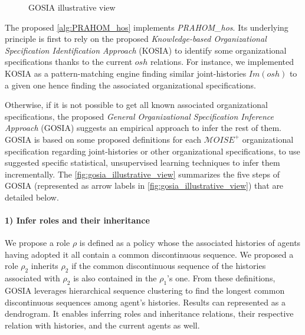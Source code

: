 \documentclass[doubleblind]{ecai}
\newcounter{relation}
\begin{document}
\label{alg:PRAHOM_hos}

\begin{figure}[h!]
    \centering
    
    \caption{GOSIA illustrative view}
    \label{fig:gosia_illustrative_view}
\end{figure}

The proposed \autoref{alg:PRAHOM_hos} implements \emph{PRAHOM\_hos}. Its underlying principle is first to rely on the proposed \emph{Knowledge-based Organizational Specification Identification Approach} (KOSIA) to identify some organizational specifications thanks to the current $osh$ relations. %
For instance, we implemented KOSIA as a pattern-matching engine finding similar joint-histories $Im(osh)$ to a given one hence finding the associated organizational specifications.

Otherwise, if it is not possible to get all known associated organizational specifications, the proposed \emph{General Organizational Specification Inference Approach} (GOSIA) suggests an empirical approach to infer the rest of them.
GOSIA is based on some proposed definitions for each $\mathcal{M}OISE^+$ organizational specification regarding joint-histories or other organizational specifications, to use suggested specific statistical, unsupervised learning techniques to infer them incrementally. The \autoref{fig:gosia_illustrative_view} summarizes the five steps of GOSIA (represented as arrow labels in \autoref{fig:gosia_illustrative_view}) that are detailed below.
%
\paragraph{1) Infer roles and their inheritance}

We propose a role $\rho$ is defined as a policy whose the associated histories of agents having adopted it all contain a common discontinuous sequence. We proposed a role $\rho_2$ inherits $\rho_2$ if the common discontinuous sequence of the histories associated with $\rho_2$ is also contained in the $\rho_1$'s one.
From these definitions, GOSIA leverages hierarchical sequence clustering to find the longest common discontinuous sequences among agent's histories. Results can represented as a dendrogram. It enables inferring roles and inheritance relations, their respective relation with histories, and the current agents as well.
\end{document}
